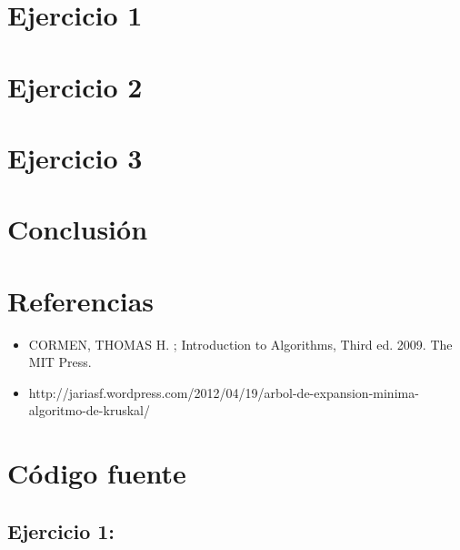 \documentclass[10pt, a4paper]{article}
\begin{document}
\section{Ejercicio 1}

\newpage

\section{Ejercicio 2}

\newpage

\section{Ejercicio 3}

\newpage

\section{Conclusión}

\section{Referencias}
\begin{itemize}
\item CORMEN, THOMAS H. ; Introduction to Algorithms, Third ed. 2009. The MIT Press.
\item http://jariasf.wordpress.com/2012/04/19/arbol-de-expansion-minima-algoritmo-de-kruskal/
\end{itemize}


\section{Código fuente}

\subsection{Ejercicio 1:}
\end{document}
